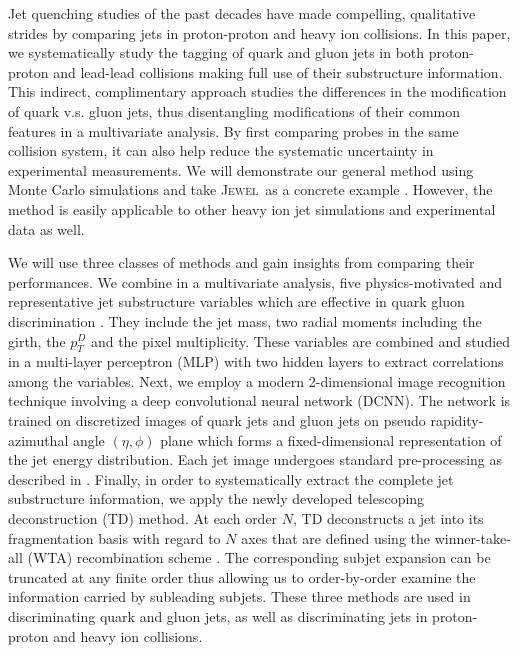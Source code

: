 \documentclass[notoc,preprintnumbers]{JHEP3}
\newcommand{\jw}{\textsc{Jewel}~}
\begin{document}
Jet quenching studies of the past decades have made compelling, qualitative strides by comparing jets in proton-proton and heavy ion collisions. In this paper, we systematically study the tagging of quark and gluon jets in both proton-proton and lead-lead collisions making full use of their substructure information. This indirect, complimentary approach studies the  differences in the modification of quark v.s. gluon jets, thus disentangling modifications of their common features in a multivariate analysis. By first comparing probes in the same collision system, it can also help reduce the systematic uncertainty in experimental measurements. We will demonstrate our general method using Monte Carlo simulations and take \jw as a concrete example \cite{Zapp:2013zya,KunnawalkamElayavalli:2016ttl}. However, the method is easily applicable to other heavy ion jet simulations \cite{Armesto:2009fj,Casalderrey-Solana:2016jvj,Cao:2017zih} and experimental data as well.

We will use three classes of methods and gain insights from comparing their performances. We combine in a multivariate analysis, five physics-motivated and representative jet substructure variables which are effective in quark gluon discrimination \cite{Gallicchio:2012ez}. They include the jet mass, two radial moments including the girth, the $p_T^D$ and the pixel multiplicity. These variables are combined and studied in a multi-layer perceptron (MLP) with two hidden layers to extract correlations among the variables. Next, we employ a modern 2-dimensional image recognition technique involving a deep convolutional neural network (DCNN). The network is trained on discretized images of quark jets and gluon jets on pseudo rapidity-azimuthal angle $(\eta,\phi)$ plane which forms a fixed-dimensional representation of the jet energy distribution. Each jet image undergoes standard pre-processing as described in \cite{deOliveira:2015xxd}. Finally, in order to systematically extract the complete jet substructure information, we apply the newly developed telescoping deconstruction (TD) method. At each order $N$, TD deconstructs a jet into its fragmentation basis with regard to $N$ axes that are defined using the winner-take-all (WTA) recombination scheme \cite{Bertolini:2013iqa}. The corresponding subjet expansion can be truncated at any finite order thus allowing us to order-by-order examine the information carried by subleading subjets. These three methods are used in discriminating quark and gluon jets, as well as discriminating jets in proton-proton and heavy ion collisions.
\end{document}
